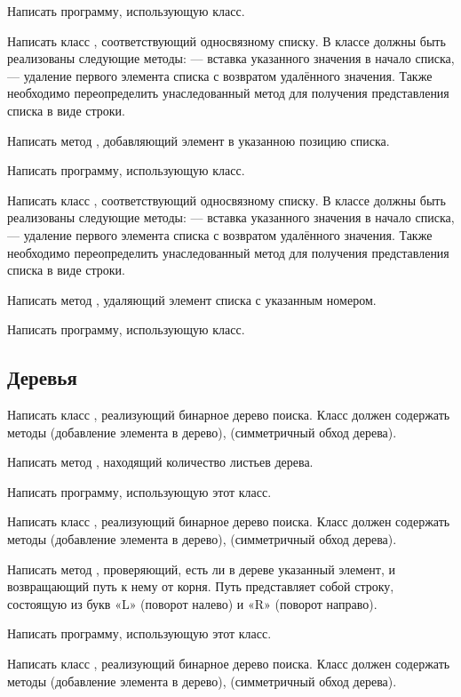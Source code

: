 Написать программу, использующую класс.

\task Написать класс , соответствующий
односвязному списку. В классе должны быть реализованы следующие
методы:  — вставка указанного значения в начало списка,
 — удаление первого элемента списка с возвратом удалённого
значения.  Также необходимо переопределить унаследованный метод
 для получения представления списка в виде строки.

Написать метод , добавляющий элемент в указанною позицию
списка.

Написать программу, использующую класс.

\task Написать класс , соответствующий
односвязному списку. В классе должны быть реализованы следующие
методы:  — вставка указанного значения в начало списка,
 — удаление первого элемента списка с возвратом удалённого
значения.  Также необходимо переопределить унаследованный метод
 для получения представления списка в виде строки.

Написать метод , удаляющий элемент списка с указанным
номером.

Написать программу, использующую класс.


\subsection{Деревья}

\task Написать класс , реализующий бинарное дерево
поиска. Класс должен содержать методы  (добавление элемента в
дерево),  (симметричный обход дерева).

Написать метод , находящий количество листьев дерева.

Написать программу, использующую этот класс.

\task Написать класс , реализующий бинарное дерево
поиска. Класс должен содержать методы  (добавление элемента в
дерево),  (симметричный обход дерева).

Написать метод , проверяющий, есть ли в дереве указанный
элемент, и возвращающий путь к нему от корня. Путь представляет собой
строку, состоящую из букв «L» (поворот налево) и «R» (поворот
направо).

Написать программу, использующую этот класс.

\task Написать класс , реализующий бинарное дерево
поиска. Класс должен содержать методы  (добавление элемента в
дерево),  (симметричный обход дерева).

